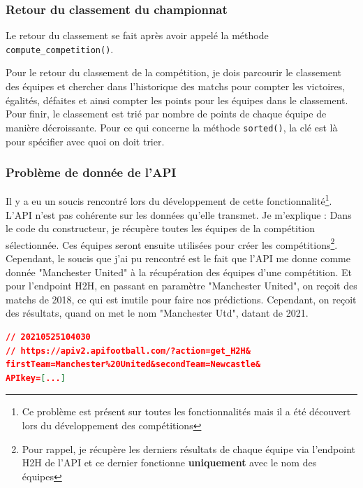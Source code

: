\documentclass[a4paper,14pt]{extarticle}
\begin{document}
{

\subsubsection{Retour du classement du championnat}

Le retour du classement se fait après avoir appelé la méthode \texttt{compute\_competition()}.

Pour le retour du classement de la compétition, je dois parcourir le classement des équipes et chercher dans l'historique des matchs pour compter les victoires, égalités, défaites et ainsi compter les points pour les équipes dans le classement. Pour finir, le classement est trié par nombre de points de chaque équipe de manière décroissante. Pour ce qui concerne la méthode \texttt{sorted()}, la clé est là pour spécifier avec quoi on doit trier.


\subsubsection{Problème de donnée de l'API}
Il y a eu un soucis rencontré lors du développement de cette fonctionnalité\footnote{Ce problème est présent sur toutes les fonctionnalités mais il a été découvert lors du développement des compétitions}. L'API n'est pas cohérente sur les données qu'elle transmet. Je m'explique :
Dans le code du constructeur, je récupère toutes les équipes de la compétition sélectionnée. Ces équipes seront ensuite utilisées pour créer les compétitions\footnote{Pour rappel, je récupère les derniers résultats de chaque équipe via l'endpoint H2H de l'API et ce dernier fonctionne \textbf{uniquement} avec le nom des équipes}. Cependant, le soucis que j'ai pu rencontré est le fait que l'API me donne comme donnée "Manchester United" à la récupération des équipes d'une compétition. Et pour l'endpoint H2H, en passant en paramètre "Manchester United", on reçoit des matchs de 2018, ce qui est inutile pour faire nos prédictions. Cependant, on reçoit des résultats, quand on met le nom "Manchester Utd", datant de 2021.


\begin{lstlisting}[language=json, firstnumber=1, caption=Aperçu du JSON avec "Manchester United", captionpos=b, label=apercuJSON]
// 20210525104030
// https://apiv2.apifootball.com/?action=get_H2H&
firstTeam=Manchester%20United&secondTeam=Newcastle&
APIkey=[...]


\end{lstlisting}}
\end{document}
